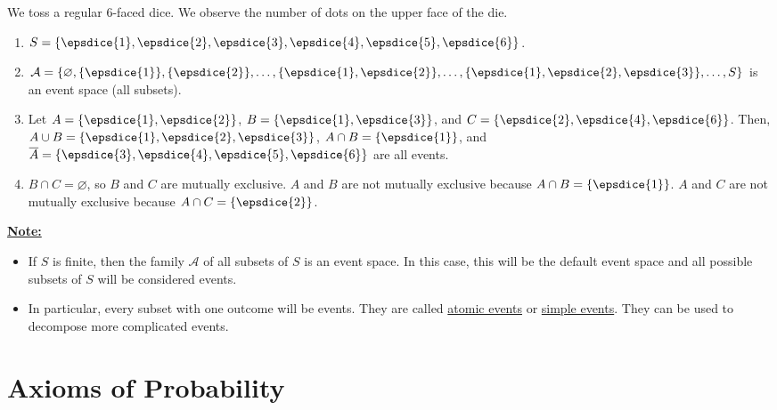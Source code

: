 	\vspace*{16pt}
	
	\begin{example}
	We toss a regular 6-faced dice. We observe the number of dots on the upper face of the die.
		\begin{enumerate}[label=\alph*)]
		\item $S = \{ \epsdice{1}, \epsdice{2}, \epsdice{3}, \epsdice{4}, \epsdice{5}, \epsdice{6} \}$.
		\item $\mathcal{A} = \{ \varnothing , \{ \epsdice{1} \} , \{ \epsdice{2} \} , \ldots , \{ \epsdice{1}, \epsdice{2} \} , \ldots , \{ \epsdice{1} , \epsdice{2} , \epsdice{3} \} , \ldots , S \}$ is an event space (all subsets).
		\item Let $A = \{ \epsdice{1} , \epsdice{2} \}$, $B = \{ \epsdice{1} , \epsdice{3} \}$, and $C = \{ \epsdice{2}, \epsdice{4}, \epsdice{6} \}$. Then, $A \cup B = \{ \epsdice{1} , \epsdice{2}, \epsdice{3} \}$, $A \cap B = \{ \epsdice{1} \}$, and $\overline{A} = \{\epsdice{3}, \epsdice{4}, \epsdice{5}, \epsdice{6} \}$ are all events.
		\item $B \cap C = \varnothing$, so $B$ and $C$ are mutually exclusive. $A$ and $B$ are not mutually exclusive because $A \cap B = \{ \epsdice{1} \}$. $A$ and $C$ are not mutually exclusive because $A \cap C = \{ \epsdice{2} \}$.
		\end{enumerate}
	\end{example}
	
	\underline{\textbf{Note:}}
	
	\begin{itemize}
	\item If $S$ is finite, then the family $\mathcal{A}$ of all subsets of $S$ is an event space. In this case, this will be the default event space and all possible subsets of $S$ will be considered events. 
	\item In particular, every subset with one outcome will be events. They are called \underline{atomic events} or \underline{simple events}. They can be used to decompose more complicated events.
	\end{itemize}
	

\section{Axioms of Probability}

